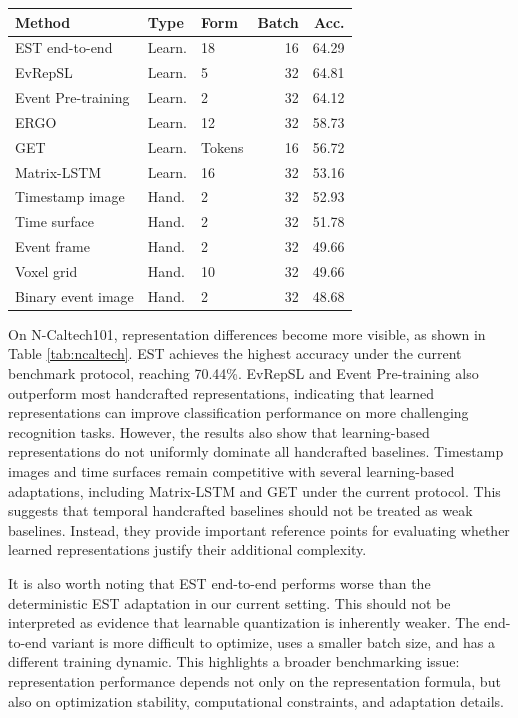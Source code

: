 \documentclass[letterpaper]{article}
\begin{document}
\begin{center}
\begin{footnotesize}
\setlength{\tabcolsep}{2pt}
\begin{tabular}{p{0.78in}|p{0.46in}|p{0.42in}|r|r}
Method & Type & Form & Batch & Acc. \\
\hline
EST end-to-end & Learn. & 18 & 16 & 64.29 \\
EvRepSL & Learn. & 5 & 32 & 64.81 \\
Event Pre-training & Learn. & 2 & 32 & 64.12 \\
ERGO & Learn. & 12 & 32 & 58.73 \\
GET & Learn. & Tokens & 16 & 56.72 \\
Matrix-LSTM & Learn. & 16 & 32 & 53.16 \\
Timestamp image & Hand. & 2 & 32 & 52.93 \\
Time surface & Hand. & 2 & 32 & 51.78 \\
Event frame & Hand. & 2 & 32 & 49.66 \\
Voxel grid & Hand. & 10 & 32 & 49.66 \\
Binary event image & Hand. & 2 & 32 & 48.68 \\
\end{tabular}
\end{footnotesize}
\label{tab:ncaltech}
\end{center}

On N-Caltech101, representation differences become more visible, as shown in Table \ref{tab:ncaltech}. EST achieves the highest accuracy under the current benchmark protocol, reaching 70.44\%. EvRepSL and Event Pre-training also outperform most handcrafted representations, indicating that learned representations can improve classification performance on more challenging recognition tasks. However, the results also show that learning-based representations do not uniformly dominate all handcrafted baselines. Timestamp images and time surfaces remain competitive with several learning-based adaptations, including Matrix-LSTM and GET under the current protocol. This suggests that temporal handcrafted baselines should not be treated as weak baselines. Instead, they provide important reference points for evaluating whether learned representations justify their additional complexity.

It is also worth noting that EST end-to-end performs worse than the deterministic EST adaptation in our current setting. This should not be interpreted as evidence that learnable quantization is inherently weaker. The end-to-end variant is more difficult to optimize, uses a smaller batch size, and has a different training dynamic. This highlights a broader benchmarking issue: representation performance depends not only on the representation formula, but also on optimization stability, computational constraints, and adaptation details.
\end{document}
